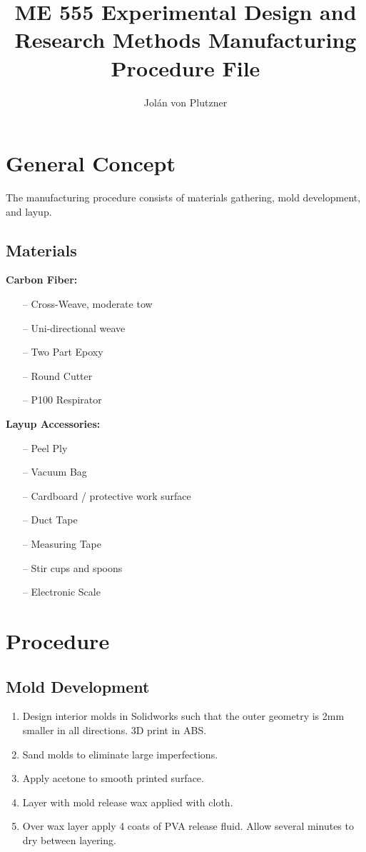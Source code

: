 \documentclass{article}
\title{ME 555 Experimental Design and Research Methods \newline \textbf{Manufacturing Procedure File}}\\
\author{Jol\'an von Plutzner}
\begin{document}
\maketitle
\section{General Concept}
The manufacturing procedure consists of materials gathering, mold development, and layup. 
\par
\begin{multicols}{2}
\section{Materials}
\textbf{Carbon Fiber:}
\begin{itemize}
    \item[--] Cross-Weave, moderate tow
    \item[--] Uni-directional weave
    \item[--] Two Part Epoxy
    \item[--] Round Cutter 
    \item[--] P100 Respirator
\end{itemize}
\textbf{Layup Accessories:}
\begin{itemize}
    \item[--] Peel Ply
    \item[--] Vacuum Bag
    \item[--] Cardboard / protective work surface
    \item[--] Duct Tape 
    \item[--] Measuring Tape
    \item[--] Stir cups and spoons
    \item[--] Electronic Scale
\end{itemize}
\end{multicols}
\section{Procedure}
\subsection{Mold Development}
\begin{enumerate}
    \item Design interior molds in Solidworks such that the outer geometry is 2mm smaller in all directions. 3D print in ABS.
    \item Sand molds to eliminate large imperfections. 
    \item Apply acetone to smooth printed surface. 
    \item Layer with mold release wax applied with cloth. 
    \item Over wax layer apply 4 coats of PVA release fluid. Allow several minutes to dry between layering. 
\end{enumerate}
\end{document}
